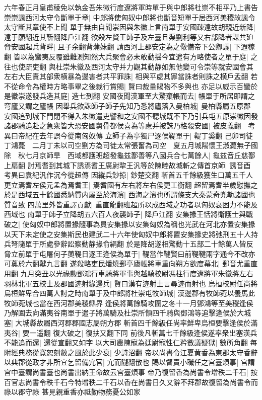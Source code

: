 六年春正月皇甫稜免以執金吾朱徽行度遼將軍時單于與中郎將杜崇不相平乃上書告崇崇諷西河太守令斷單于章|{
	中郎將使匈奴中郎將也斷音短單于居西河美稷故諷令太守斷其章使不上聞}
單于無由自聞崇因與朱徽上言南單于安國疎遠故胡親近新降|{
	遠于願翻近其靳翻降戶江翻}
欲殺左賢王師子及左臺且渠劉利等又右部降者謀共廹脅安國起兵背畔|{
	且子余翻背蒲妹翻}
請西河上郡安定為之儆備帝下公卿議|{
	下遐稼翻}
皆以為蠻夷反覆雖難測知然大兵聚會必未敢動揺今宜遣有方略使者之單于庭|{
	之往也使疏吏翻}
與杜崇朱徽及西河太守并力觀其動静如無他變可令崇等就安國會其左右大臣責其部衆横暴為邊害者共平罪誅|{
	相與平處其罪當誅者則誅之横戶孟翻}
若不從命令為權時方略事畢之後裁行賞賜|{
	賢曰裁量賜物不多與也}
亦足以威示百蠻於是徽崇遂發兵造其庭|{
	造七到翻}
安國夜聞漢軍至大驚棄帳而去|{
	帳單于所居即謂之穹廬又謂之廬帳}
因舉兵欲誅師子師子先知乃悉將廬落入曼柏城|{
	曼柏縣屬五原郡}
安國追到城下門閉不得入朱徽遣吏譬和之安國不聽城既不下乃引兵屯五原崇徽因發諸郡騎追赴之急衆皆大恐安國舅骨都侯喜為等慮并被誅乃格殺安國|{
	被皮義翻　考異曰帝紀在去年誤今從南匈奴傳}
立師子為亭獨尸逐侯鞮單于|{
	鞮丁奚翻}
己卯司徒丁鴻薨　二月丁未以司空劉方為司徒太常張奮為司空　夏五月城陽懷王淑薨無子國除　秋七月京師旱　西域都護班超發龜兹鄯善等八國兵合七萬餘人|{
	龜兹音丘慈鄯上扇翻}
討焉耆到其城下誘焉耆王廣尉犂王汎等於陳睦故城斬之傳首京師|{
	誘音酉　考異曰袁紀汎作沉今從超傳}
因縱兵鈔掠|{
	鈔楚交翻}
斬首五千餘級獲生口萬五千人更立焉耆左侯元孟為焉耆王|{
	焉耆國有左右將左右侯更工衡翻}
超留焉耆半歲慰撫之於是西域五十餘國悉納質内屬至於海濱|{
	西海之濱也所謂條支大秦蒙奇兜勒諸國也質音致}
四萬里外皆重譯貢獻|{
	重直龍翻班超所以成西域之功者以匈奴衰困力不能及西域也}
南單于師子立降胡五六百人夜襲師子|{
	降戶江翻}
安集掾王恬將衛護士與戰破之|{
	使匈奴中郎將置掾隨事為員安集掾以安集匈奴為稱也光武在河北亦置安集掾以天下未定使之安集斯民也建武二十六年使匈奴中郎將置安集掾史將弛刑五十人持兵弩隨單于所處參辭訟察動静掾俞絹翻}
於是降胡遂相驚動十五部二十餘萬人皆反脅立前單于屯屠何子薁鞮日逐王逢侯為單于|{
	鞮當作鞬賢曰前鞮鞬兩字通今不改亦可薁於六翻鞬九言翻}
遂殺略吏民燔燒郵亭廬帳將車重向朔方欲度幕北|{
	郵音尤重直用翻}
九月癸丑以光祿勲鄧鴻行車騎將軍事與越騎校尉馮柱行度遼將軍朱徽將左右羽林北軍五校士及郡國迹射緣邊兵|{
	賢曰漢有迹射士言尋迹而射也}
烏桓校尉任尚將烏桓鮮卑合四萬人討之時南單于及中郎將杜崇屯牧師城|{
	漢邊郡有牧師菀以養馬此牧師菀城也當在西河郡美稷縣界}
逢侯將萬餘騎攻圍之冬十一月鄧鴻等至美稷逢侯乃解圍去向滿夷谷南單于遣子將萬騎及杜崇所領四千騎與鄧鴻等追擊逢侯於大城塞|{
	大城縣故屬西河郡郡國志屬朔方郡}
斬首四千餘級任尚率鮮卑烏桓要擊逢侯於滿夷谷|{
	要一遥翻}
復大破之|{
	復扶又翻下同}
前後凡斬萬七千餘級逢侯遂率衆出塞漢兵不能追而還|{
	還從宣翻又如字}
以大司農陳寵為廷尉寵性仁矜數議疑獄|{
	數所角翻}
每附經典務從寛恕刻敝之風於此少衰|{
	少詩沼翻}
帝以尚書令江夏黄香為東郡太守香辭以典郡從政才非所宜乞留備宂官|{
	宂而隴翻散也}
賜以督責小職任之宫臺煩事|{
	宫謂宫中臺謂尚書臺也尚書出納王命故云宫臺煩事}
帝乃復留香為尚書令增秩二千石|{
	按百官志尚書令秩千石今特增秩二千石以香在尚書日久又辭不拜郡故復留為尚書令而祿以郡守祿}
甚見親重香亦祗勤物務憂公如家

